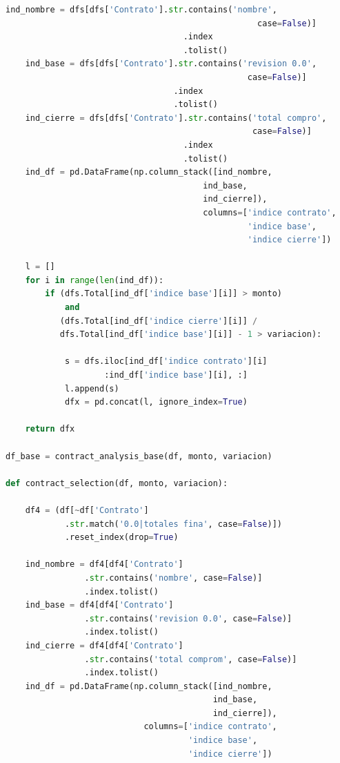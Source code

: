 \begin{lstlisting}[language=Python]
    ind_nombre = dfs[dfs['Contrato'].str.contains('nombre', 
                                                   case=False)]
                                    .index
                                    .tolist()
    ind_base = dfs[dfs['Contrato'].str.contains('revision 0.0', 
                                                 case=False)]
                                  .index
                                  .tolist()
    ind_cierre = dfs[dfs['Contrato'].str.contains('total compro', 
                                                  case=False)]
                                    .index
                                    .tolist()
    ind_df = pd.DataFrame(np.column_stack([ind_nombre, 
                                        ind_base, 
                                        ind_cierre]), 
                                        columns=['indice contrato', 
                                                 'indice base', 
                                                 'indice cierre'])

    l = []
    for i in range(len(ind_df)):
        if (dfs.Total[ind_df['indice base'][i]] > monto) 
            and 
           (dfs.Total[ind_df['indice cierre'][i]] /
           dfs.Total[ind_df['indice base'][i]] - 1 > variacion):

            s = dfs.iloc[ind_df['indice contrato'][i]
                    :ind_df['indice base'][i], :]
            l.append(s)
            dfx = pd.concat(l, ignore_index=True) 
        
    return dfx

df_base = contract_analysis_base(df, monto, variacion)

def contract_selection(df, monto, variacion):

    df4 = (df[~df['Contrato']
            .str.match('0.0|totales fina', case=False)])
            .reset_index(drop=True) 

    ind_nombre = df4[df4['Contrato']
                .str.contains('nombre', case=False)]
                .index.tolist()
    ind_base = df4[df4['Contrato']
                .str.contains('revision 0.0', case=False)]
                .index.tolist()
    ind_cierre = df4[df4['Contrato']
                .str.contains('total comprom', case=False)]
                .index.tolist()
    ind_df = pd.DataFrame(np.column_stack([ind_nombre, 
                                          ind_base, 
                                          ind_cierre]), 
                            columns=['indice contrato', 
                                     'indice base', 
                                     'indice cierre'])


\end{lstlisting}
